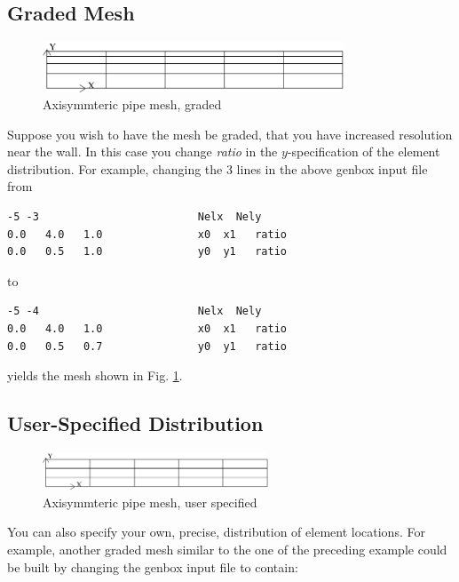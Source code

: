 \subsection{Graded Mesh}
\begin{figure}
\centering
\includegraphics[width=0.8\textwidth]{Figs/mesh_axi2}
\caption{Axisymmteric pipe mesh, graded}
\label{fig:mesh_axi2}
\end{figure}

Suppose you wish to have the mesh be graded,
that you have increased resolution near the wall.
In this case you change {\em ratio} in the \(y\)-specification
of the element distribution.  For example, changing the 3 lines
in the above genbox input file from

\begin{verbatim}
-5 -3                         Nelx  Nely
0.0   4.0   1.0               x0  x1   ratio
0.0   0.5   1.0               y0  y1   ratio
\end{verbatim}

\noindent
to

\begin{verbatim}
-5 -4                         Nelx  Nely
0.0   4.0   1.0               x0  x1   ratio
0.0   0.5   0.7               y0  y1   ratio
\end{verbatim}

\noindent
yields the mesh shown in Fig. \ref{fig:mesh_axi2}.


\subsection{User-Specified Distribution}
\begin{figure}
\centering
\includegraphics[width=0.6\textwidth]{Figs/mesh_axi1}
\caption{Axisymmteric pipe mesh, user specified}
\label{fig:mesh_axi1}
\end{figure}

You can also specify your own, precise, distribution of element
locations.   For example, another graded mesh similar to the
one of the preceding example could be built by changing the
genbox input file to contain:


